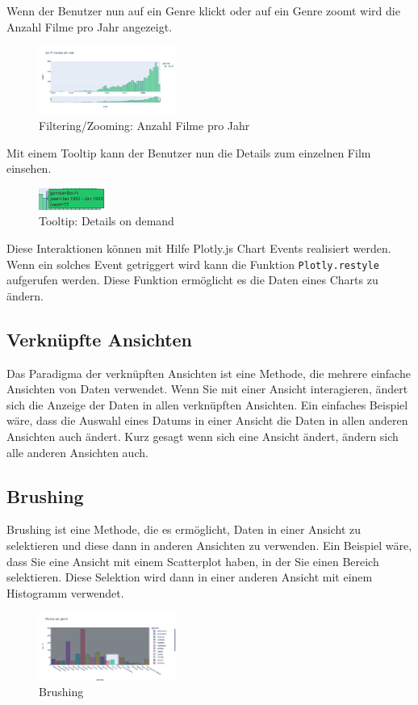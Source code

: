 \documentclass{article}
\begin{document}
Wenn der Benutzer nun auf ein Genre klickt oder auf ein Genre zoomt wird die Anzahl Filme pro Jahr angezeigt.\\

\begin{figure}[!h]
\centering
\includegraphics[width=0.4\textwidth]{img/movies-scifi.png}
\caption{\label{fig: LE2 Schneiderman Zoom} Filtering/Zooming: Anzahl Filme pro Jahr}
\end{figure}


Mit einem Tooltip kann der Benutzer nun die Details zum einzelnen Film einsehen.

\begin{figure}[!h]
    \centering
    \includegraphics[width=0.2\textwidth]{img/tooltip.png}
    \caption{\label{fig: LE2 Schneiderman Zoom} Tooltip: Details on demand}
    \end{figure}
Diese Interaktionen können mit Hilfe Plotly.js Chart Events realisiert werden. Wenn ein solches Event getriggert wird kann die Funktion \texttt{Plotly.restyle} aufgerufen werden. Diese Funktion ermöglicht es die Daten eines Charts zu ändern.\\


\newpage
\subsection{Verknüpfte Ansichten}
Das Paradigma der verknüpften Ansichten ist eine Methode, die mehrere einfache Ansichten von Daten verwendet. Wenn Sie mit einer Ansicht interagieren, ändert sich die Anzeige der Daten in allen verknüpften Ansichten. Ein einfaches Beispiel wäre, dass die Auswahl eines Datums in einer Ansicht die Daten in allen anderen Ansichten auch ändert.
Kurz gesagt wenn sich eine Ansicht ändert, ändern sich alle anderen Ansichten auch.\cite{wills_linked_2008} \\
\subsection{Brushing}
Brushing ist eine Methode, die es ermöglicht, Daten in einer Ansicht zu selektieren und diese dann in anderen Ansichten zu verwenden. Ein Beispiel wäre, dass Sie eine Ansicht mit einem Scatterplot haben, in der Sie einen Bereich selektieren. Diese Selektion wird dann in einer anderen Ansicht mit einem Histogramm verwendet.\cite{becker_brushing_1987} \\

\begin{figure}[!h]
\centering
\includegraphics[width=0.4\textwidth]{img/brushing.png}
\caption{\label{fig: LE2 Brushing} Brushing}

\end{figure}
\newpage


\printbibliography
\end{document}
